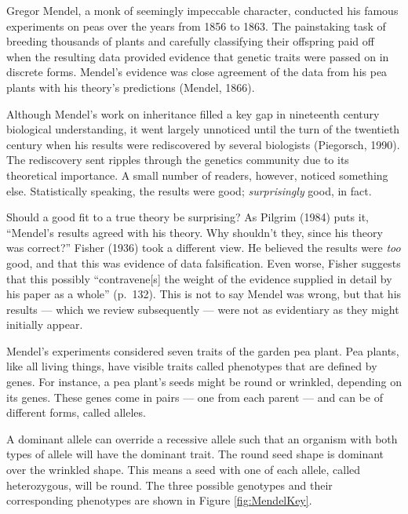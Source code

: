 \documentclass[english,floatsintext,man]{apa6}
\theoremstyle{definition}
\theoremstyle{definition}
\theoremstyle{definition}
\theoremstyle{remark}
\begin{document}
Gregor Mendel, a monk of seemingly impeccable character, conducted his
famous experiments on peas over the years from 1856 to 1863. The
painstaking task of breeding thousands of plants and carefully
classifying their offspring paid off when the resulting data provided
evidence that genetic traits were passed on in discrete forms. Mendel's
evidence was close agreement of the data from his pea plants with his
theory's predictions (Mendel, 1866).

Although Mendel's work on inheritance filled a key gap in nineteenth
century biological understanding, it went largely unnoticed until the
turn of the twentieth century when his results were rediscovered by
several biologists (Piegorsch, 1990). The rediscovery sent ripples
through the genetics community due to its theoretical importance. A
small number of readers, however, noticed something else. Statistically
speaking, the results were good; \emph{surprisingly} good, in fact.

Should a good fit to a true theory be surprising? As Pilgrim (1984) puts
it, \enquote{Mendel's results agreed with his theory. Why shouldn't
they, since his theory was correct?} Fisher (1936) took a different
view. He believed the results were \emph{too} good, and that this was
evidence of data falsification. Even worse, Fisher suggests that this
possibly \enquote{contravene{[}s{]} the weight of the evidence supplied
in detail by his paper as a whole} (p.~132). This is not to say Mendel
was wrong, but that his results --- which we review subsequently ---
were not as evidentiary as they might initially appear.

Mendel's experiments considered seven traits of the garden pea plant.
Pea plants, like all living things, have visible traits called
phenotypes that are defined by genes. For instance, a pea plant's seeds
might be round or wrinkled, depending on its genes. These genes come in
pairs --- one from each parent --- and can be of different forms, called
alleles.

A dominant allele can override a recessive allele such that an organism
with both types of allele will have the dominant trait. The round seed
shape is dominant over the wrinkled shape. This means a seed with one of
each allele, called heterozygous, will be round. The three possible
genotypes and their corresponding phenotypes are shown in Figure
\ref{fig:MendelKey}.
\end{document}
